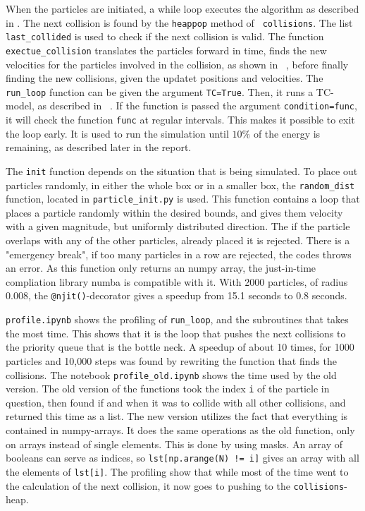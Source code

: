 \documentclass{article}
\begin{document}
        When the particles are initiated, a while loop executes the algorithm as described in \cite{exercise}. The next collision is found by the \verb|heappop| method of \verb| collisions|. The list \verb|last_collided| is used to check if the next collision is valid. The function \verb|exectue_collision| translates the particles forward in time, finds the new velocities for the particles involved in the collision, as shown in ~\cite{exercise}, before finally finding the new collisions, given the updatet positions and velocities. The \verb|run_loop| function can be given the argument \verb|TC=True|. Then, it runs a TC-model, as described in ~\cite{TC}. If the function is passed the argument \verb|condition=func|, it will check the function \verb|func| at regular intervals. This makes it possible to exit the loop early. It is used to run the simulation until $10\%$ of the energy is remaining, as described later in the report.

        The \verb|init| function depends on the situation that is being simulated. To place out particles randomly, in either the whole box or in a smaller box, the \verb|random_dist| function, located in \verb|particle_init.py| is used. This function contains a loop that places a particle randomly within the desired bounds, and gives them velocity with a given magnitude, but uniformly distributed direction. The if the particle overlaps with any of the other particles, already placed it is rejected. There is a "emergency break", if too many particles in a row are rejected, the codes throws an error. As this function only returns an numpy array, the just-in-time compliation library numba is compatible with it. With 2000 particles, of radius 0.008, the \verb|@njit()|-decorator gives a speedup from 15.1 seconds to 0.8 seconds.

        \verb|profile.ipynb| shows the profiling of \verb|run_loop|, and the subroutines that takes the most time. This shows that it is the loop that pushes the next collisions to the priority queue that is the bottle neck. A speedup of about 10 times, for 1000 particles and 10,000 steps was found by rewriting the function that finds the collisions. The notebook \verb|profile_old.ipynb| shows the time used by the old version. The old version of the functions took the index \verb|i| of the particle in question, then found if and when it was to collide with all other collisions, and returned this time as a list. The new version utilizes the fact that everything is contained in numpy-arrays. It does the same operations as the old function, only on arrays instead of single elements. This is done by using masks. An array of booleans can serve as indices, so \verb|lst[np.arange(N) != i]| gives an array with all the elements of \verb|lst[i]|. The profiling show that while most of the time went to the calculation of the next collision, it now goes to pushing to the \verb|collisions|-heap.
\end{document}
